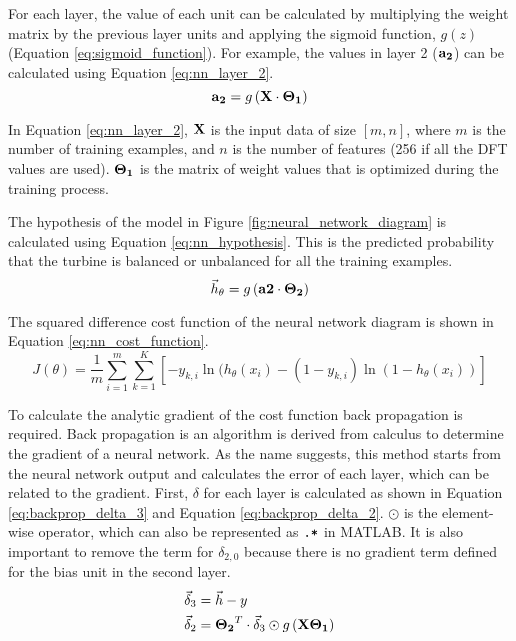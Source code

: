 For each layer, the value of each unit can be calculated by multiplying the weight matrix by the previous layer units and applying the sigmoid function, $g(z)$ (Equation \ref{eq:sigmoid_function}).  For example, the values in layer 2 ($\mathbf{a_2}$) can be calculated using Equation \ref{eq:nn_layer_2}.
\begin{equation} \label{eq:nn_layer_2}
	\mathbf{a_2} = g\left(\mathbf{X} \cdot \mathbf{\Theta_1}\right)
\end{equation}

In Equation \ref{eq:nn_layer_2}, $\mathbf{X}$ is the input data of size $[m,n]$, where $m$ is the number of training examples, and $n$ is the number of features (256 if all the DFT values are used).  $\mathbf{\Theta_1}$ is the matrix of weight values that is optimized during the training process.

The hypothesis of the model in Figure \ref{fig:neural_network_diagram} is calculated using Equation \ref{eq:nn_hypothesis}.  This is the predicted probability that the turbine is balanced or unbalanced for all the training examples.
\begin{equation} \label{eq:nn_hypothesis}
	\vec{h}_{\theta} = g\left(\mathbf{a2} \cdot \mathbf{\Theta_2} \right)
\end{equation}

The squared difference cost function of the neural network diagram is shown in Equation \ref{eq:nn_cost_function}.
\begin{equation} \label{eq:nn_cost_function}
	J(\theta) = \frac{1}{m} \sum_{i=1}^{m}{\sum_{k=1}^{K}{\left[-y_{k,i} \ln{(h_{\theta}(x_i)} - (1-y_{k,i}) \ln{(1-h_{\theta}(x_i))} \right]}}
\end{equation}

To calculate the analytic gradient of the cost function back propagation is required.  Back propagation is an algorithm is derived from calculus to determine the gradient of a neural network.  As the name suggests, this method starts from the neural network output and calculates the error of each layer, which can be related to the gradient.  First, $\delta$ for each layer is calculated as shown in Equation \ref{eq:backprop_delta_3} and Equation \ref{eq:backprop_delta_2}.  $\odot$ is the element-wise operator, which can also be represented as $\texttt{.*}$ in MATLAB.  It is also important to remove the term for $\delta_{2,0}$ because there is no gradient term defined for the bias unit in the second layer.
\begin{align}
	\vec{\delta}_3 &= \vec{h} - y \label{eq:backprop_delta_3}\\
	\vec{\delta}_2 &= \mathbf{\Theta_2}^T \cdot \vec{\delta}_3 \odot g\left(\mathbf{X} \mathbf{\Theta_1}\right) \label{eq:backprop_delta_2}
\end{align}

